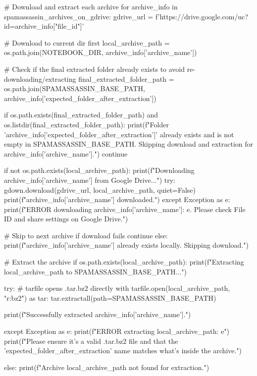 \begin{ffcode}
# Download and extract each archive
for archive_info in spamassassin_archives_on_gdrive:
    gdrive_url = f'https://drive.google.com/uc?id={archive_info["file_id"]}'

    # Download to current dir first
    local_archive_path = os.path.join(NOTEBOOK_DIR, archive_info['archive_name'])

    # Check if the final extracted folder already exists to avoid re-downloading/extracting
    final_extracted_folder_path = os.path.join(SPAMASSASSIN_BASE_PATH, archive_info['expected_folder_after_extraction'])

    if os.path.exists(final_extracted_folder_path) and os.listdir(final_extracted_folder_path):
        print(f"Folder '{archive_info['expected_folder_after_extraction']}' already exists and is not empty in {SPAMASSASSIN_BASE_PATH}. Skipping download and extraction for {archive_info['archive_name']}.")
        continue

    if not os.path.exists(local_archive_path):
        print(f"Downloading {archive_info['archive_name']} from Google Drive...")
        try:
            gdown.download(gdrive_url, local_archive_path, quiet=False)
            print(f"{archive_info['archive_name']} downloaded.")
        except Exception as e:
            print(f"ERROR downloading {archive_info['archive_name']}: {e}. Please check File ID and share settings on Google Drive.")

            # Skip to next archive if download fails
            continue
    else:
        print(f"{archive_info['archive_name']} already exists locally. Skipping download.")

    # Extract the archive
    if os.path.exists(local_archive_path):
        print(f"Extracting {local_archive_path} to {SPAMASSASSIN_BASE_PATH}...")

        try:
            # tarfile opens .tar.bz2 directly
            with tarfile.open(local_archive_path, "r:bz2") as tar:
                tar.extractall(path=SPAMASSASSIN_BASE_PATH)

            print(f"Successfully extracted {archive_info['archive_name']}.")

        except Exception as e:
            print(f"ERROR extracting {local_archive_path}: {e}")
            print(f"Please ensure it's a valid .tar.bz2 file and that the 'expected_folder_after_extraction' name matches what's inside the archive.")

    else:
        print(f"Archive {local_archive_path} not found for extraction.")


\end{ffcode}
